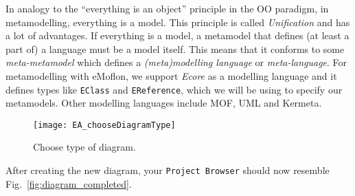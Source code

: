 \vspace{1cm}

In analogy to the ``everything is an object'' principle in the OO paradigm, in metamodelling, everything is a model. 
This principle is called \emph{Unification} and has a lot of advantages. If everything is a model, a metamodel that defines (at least a part of) a language must be a model itself.
This means that it conforms to some \emph{meta-metamodel} which defines a \emph{(meta)modelling language} or \emph{meta-language}.
For metamodelling with eMoflon, we support \emph{Ecore} as a modelling language and it defines types like \texttt{EClass} and \texttt{EReference}, which we will be using to specify  our metamodels.
Other modelling languages include MOF, UML and Kermeta.

\begin{figure}[htbp]
	\centering
  \texttt{[image: EA\_chooseDiagramType]}
	\caption{Choose type of diagram.}
	\label{fig:diagram_type}
\end{figure}
\FloatBarrier

After creating the new diagram, your  \texttt{Project Browser} should now resemble Fig.~\ref{fig:diagram_completed}.

